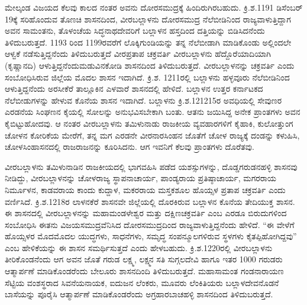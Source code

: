 ಮೇಲ್ಕಂಡ ವಿಜಯದ ಕೆಲವು ಕಾಲದ ನಂತರ ಅವನು ದೋರಸಮುದ್ರಕ್ಕೆ ಹಿಂದಿರುಗಿರಬಹುದು. ಕ್ರಿ.ಶ.1191 ಡಿಸೆಂಬರ್​ 19ಕ್ಕೆ ಸರಿಹೊಂದುವ ತೊಣಚಿ ಶಾಸನದಿಂದ, ವೀರಬಲ್ಲಾಳನು ದೋರಸಮುದ್ರ ನೆಲೆಬೀಡಿನಿಂದ ರಾಜ್ಯವಾಳುತ್ತಿದ್ದಾಗ ಅವನ ಸಾಮಂತನು, ತೊಳಂಚೆಯ ಸಿದ್ಧನಾಥದೇವರಿಗೆ ಬಲ್ಲಾಳನ ಹಸ್ತದಿಂದ ದತ್ತಿಯನ್ನು ಬಿಡಿಸಿದನೆಂದು ತಿಳಿದುಬರುತ್ತದೆ. 1193 ರಿಂದ 1199ರವರೆಗೆ ಲೊಕ್ಕಿಗುಂಡಿಯನ್ನು ತನ್ನ ನೆಲೆಬೀಡಾಗಿ ಮಾಡಿಕೊಂಡು ಅಲ್ಲಿಂದಲೇ ಆಳ್ವಕೆ ನಡೆಸುತ್ತಿದ್ದನೆಂದು ತಿಳಿದುಬರುತ್ತದೆ ವೀರಪ್ರತಾಪ ಚಕ್ರವರ್ತಿ ವೀರಬಲ್ಲಾಳನು ಹೆದ್ದೊರೆಯಾದಿಯಾಗಿ (ಕೃಷ್ಣಾನದಿ) ಆಳುತ್ತಿದ್ದನೆಂದು\break ಮಡುವಿನಕೋಡಿ ಶಾಸನದಿಂದ ತಿಳಿದುಬರುತ್ತದೆ. ವೀರಬಲ್ಲಾಳನನ್ನು ಚಕ್ರವರ್ತಿ ಎಂದು ಸಂಬೋಧಿಸಿರುವ ಜಿಲ್ಲೆಯ ಮೊದಲ ಶಾಸನ ಇದಾಗಿದೆ. ಕ್ರಿ.ಶ. 1211ರಲ್ಲಿ ಬಲ್ಲಾಳನು ಹಳ್ಳವೂರು ನೆಲೆಬೀಡಿನಿಂದ ಆಳುತ್ತಿದ್ದನೆಂದು ಅರಸೀಕೆರೆ ತಾಲ್ಲೂಕಿನ ಎಳವಾರೆ ಶಾಸನದಲ್ಲಿ ಹೇಳಿದೆ. ಬಲ್ಲಾಳನ ಉತ್ತರ ಕರ್ನಾಟಕದ ನೆಲೆಬೀಡುಗಳನ್ನು ಹೇಳುವ ಕೊನೆಯ ಶಾಸನ ಇದಾಗಿದೆ. ಬಲ್ಲಾಳನು ಕ್ರಿ.ಶ.1212\enginline{-}15ರ ಅವಧಿಯಲ್ಲಿ ಸೇವುಣರ ಎರಡನೆಯ ಸಿಂಘಣನ ಕೈಯಲ್ಲಿ ಸೋಲನ್ನು ಅನುಭವಿಸಬೇಕಾಗಿ ಬಂತು. ಆತನು ಜಯಿಸಿದ್ದ ಅನೇಕ ಪ್ರಾಂತಗಳು ಅವನ ಕೈಬಿಟ್ಟುಹೋದವು. ಆ ನಂತರ ವೀರಬಲ್ಲಾಳನು ತಮಿಳುನಾಡು ರಾಜಕೀಯ ವ್ಯವಹಾರಗಳಿಗೆ ಕೈಹಾಕಿ, ಕುಲೋತ್ತುಂಗ ಚೋಳನ ಕೋರಿಕೆಯ ಮೇರೆಗೆ, ತನ್ನ ಮಗ ಎರಡನೇ ವೀರನಾರಸಿಂಹನ ಜೊತೆಗೆ ಚೋಳ ರಾಜ್ಯಕ್ಕೆ ದಂಡನ್ನು ಕಳುಹಿಸಿ, ಚೋಳಸಿಂಹಾಸನದಲ್ಲಿ ರಾಜರಾಜನನ್ನು ಕೂರಿಸಿದನು. ಆಗ ಇವನಿಗೆ ಕೆಲವು ಪ್ರಾಂತಗಳು ದೊರೆತವು.

ವೀರಬಲ್ಲಾಳನು ತಮಿಳುನಾಡಿನ ರಾಜಕೀಯದಲ್ಲಿ ಭಾಗವಹಿಸಿ ಪಡೆದ ಯಶಸ್ಸುಗಳನ್ನು, ದೊಡ್ಡಗರುಡನಹಳ್ಳಿ ಶಾಸನವು ನೀಡಿದ್ದು, ವೀರಬಲ್ಲಾಳನನ್ನು ಚೋಳರಾಜ್ಯ ಸ್ಥಾಪನಾಚಾರ್ಯ, ಪಾಂಡ್ಯರಾಯ ಪ್ರತಿಷ್ಠಾಚಾರ್ಯ, ಮಗರರಾಯ ನಿರ್ಮೂಳನ, ಕಾಡವರಾಯ ಕಾಂದು ಕುದ್ದಾಳ, ಮಕರರಾಯ ಮಸ್ತಕಶೂಲ ಹೊಯ್ಸಳ ಪ್ರತಾಪ ಚಕ್ರವರ್ತಿ ಎಂದು ವರ್ಣಿಸಿದೆ. ಕ್ರಿ.ಶ.1218ರ ಲಾಳನಕೆರೆ ಶಾಸನವೇ ಜಿಲ್ಲೆಯಲ್ಲಿ ದೊರಕಿರುವ ಬಲ್ಲಾಳನ ಕೊನೆಯ ತೇದಿಯುಕ್ತ ಶಾಸನ. ಈ ಶಾಸನದಲ್ಲಿ ವೀರಬಲ್ಲಾಳನನ್ನು ಮಹಾಮಂಡಳೇಶ್ವರ ಮತ್ತು ದಕ್ಷಿಣಚಕ್ರವರ್ತಿ ಎಂಬ ಎರಡೂ ಬಿರುದುಗಳಿಂದ ಸಂಬೋಧಿಸಿ ಈತನು ವಿಜಯಸಮುದ್ರವೆನಿಸಿದ ದೋರಸಮುದ್ರದಿಂದ ರಾಜ್ಯವಾಳುತ್ತಿದ್ದನೆಂದು ಹೇಳಿದೆ. “ಈ ವೇಳೆಗೆ ಹೊಯ್ಸಳರ ಮೊದಮೊದಲ ಯುದ್ಧಗಳು, ಸಾಧನೆಗಳು, ಸಮೃದ್ಧ ಸಂಪನ್ಮೂಲಗಳಿರುವ ಸ್ಥಳಗಳು ಕೈತಪ್ಪಿಹೋಗಿದ್ದವು” ಎಂಬ ಹೇಳಿಕೆಯನ್ನು ಈ ಶಾಸನ ಸಮರ್ಥಿಸುತ್ತದೆ ಎಂದು ಹೇಳಬಹುದು. ಕ್ರಿ.ಶ.1220ರಲ್ಲಿ ವೀರಬಲ್ಲಾಳನು ತೀರಿಕೊಂಡನೆಂದು ಆಗ ಅವನ ಜೊತೆ ಗರುಡ ಲಕ್ಷ್ಮ, ಲಕ್ಷ್ಮನ ಸತಿ ಸುಗ್ಗಲದೇವಿ ಹಾಗೂ ಇತರ 1000 ಗರುಡರು ಆತ್ಮಾರ್ಪಣೆ ಮಾಡಿಕೊಂಡರೆಂದು ಬೇಲೂರು ಶಾಸನದಿಂದಿ ತಿಳಿದುಬರುತ್ತದೆ. ಮಹಾಸಾಮಂತ ಗಂಡನಾರಾಯಣ ಸೆಟ್ಟಿಯ ವಂಶಸ್ಥರಾದ ಸಿವನೆಯನಾಯಕ, ಐದುಜನ ಲೆಂಕರು, ಮೂವರು ಲೆಂಕಿತಿಯರು ಬಲ್ಲಾಳದೇವನೊಡನೆ ಬಾಸೆಯನ್ನು ಪೂರೈಸಿ ಆತ್ಮಾರ್ಪಣೆ ಮಾಡಿಕೊಂಡರೆಂದು ಅಗ್ರಹಾರಬಾಚಹಳ್ಳಿ ಶಾಸನದಿಂದ ತಿಳಿದುಬರುತ್ತದೆ.

